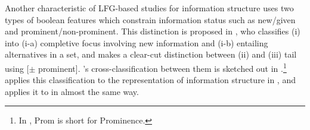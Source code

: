 Another characteristic of LFG-based studies for information structure
uses two types of boolean features which constrain information status
such as new/given and prominent/non-prominent. This distinction is
proposed in \citet{choi:99}, who classifies (i)  into (i-a)
completive focus involving new information and (i-b) 
entailing alternatives in a set, and makes a
clear-cut distinction between (ii)  and (iii) tail using
[\ensuremath{\pm} prominent]. \citeauthor{choi:99}'s cross-classification between them is
sketched out in .\footnote{In
  , Prom is short for Prominence.}
\citeauthor{choi:99} applies this classification to the representation
of information structure in , and \citet{man:07} applies
it to  in almost the same way.




